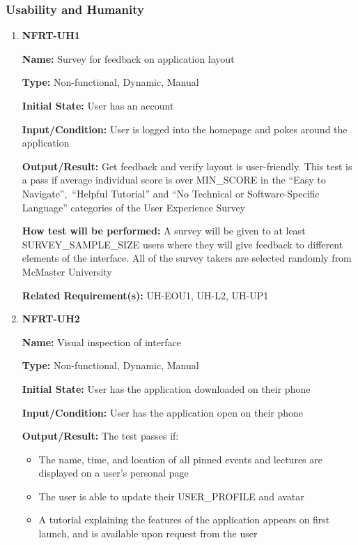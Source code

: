 \documentclass[12pt, titlepage]{article}
\begin{document}
\subsubsection{Usability and Humanity}

\begin{enumerate}
\item{\textbf{NFRT-UH1}}

\textbf{Name:} Survey for feedback on application layout

\textbf{Type:} Non-functional, Dynamic, Manual
					
\textbf{Initial State:} User has an account

\textbf{Input/Condition:} User is logged into the homepage and pokes around the application
					
\textbf{Output/Result:} Get feedback and verify layout is user-friendly. This test is a pass if average individual score is over MIN\_SCORE in the ``Easy to Navigate'',\
``Helpful Tutorial'' and ``No Technical or Software-Specific Language'' categories of the User Experience Survey
					
\textbf{How test will be performed:} A survey will be given to at least
SURVEY\_SAMPLE\_SIZE users where they will give feedback to different elements of the interface. All of the survey takers are selected randomly from McMaster University

\textbf{Related Requirement(s):} UH-EOU1, UH-L2, UH-UP1

\item{\textbf{NFRT-UH2}}

\textbf{Name:} Visual inspection of interface

\textbf{Type:} Non-functional, Dynamic, Manual
					
\textbf{Initial State:} User has the application downloaded on their phone
					
\textbf{Input/Condition:} User has the application open on their phone
					
\textbf{Output/Result:} The test passes if:
\begin{itemize}
  \item The name, time, and location of all pinned events and lectures are displayed on a user's personal page
  \item The user is able to update their USER\_PROFILE and avatar
  \item A tutorial explaining the features of the application appears on first launch, and is available upon request from the user
\end{itemize}


\end{enumerate}
\end{document}
